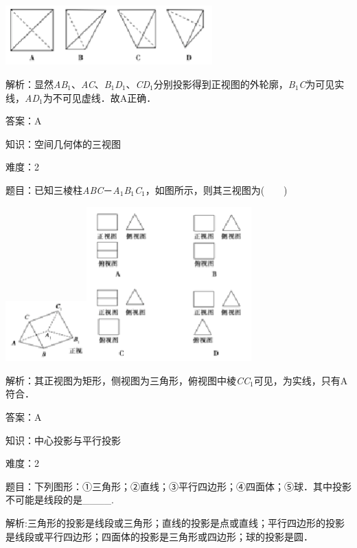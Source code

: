 \documentclass{article} %
\begin{document}
\includegraphics*[width=3.14in, height=0.90in, keepaspectratio=false]{image39}

解析：显然\textit{AB}${}_{1}$、\textit{AC}、\textit{B}${}_{1}$\textit{D}${}_{1}$、\textit{CD}${}_{1}$分别投影得到正视图的外轮廓，\textit{B}${}_{1}$\textit{C}为可见实线，\textit{AD}${}_{1}$为不可见虚线．故A正确．

答案：A


知识：空间几何体的三视图

难度：2

题目：已知三棱柱\textit{ABC}－\textit{A}${}_{1}$\textit{B}${}_{1}$\textit{C}${}_{1}$，如图所示，则其三视图为(　　)

\includegraphics*[width=1.23in, height=0.91in, keepaspectratio=false]{image40}\includegraphics*[width=2.50in, height=2.34in, keepaspectratio=false]{image41}

解析：其正视图为矩形，侧视图为三角形，俯视图中棱\textit{CC}${}_{1}$可见，为实线，只有A符合．

答案：A

知识：中心投影与平行投影

难度：2

题目：下列图形：①三角形；②直线；③平行四边形；④四面体；⑤球．其中投影不可能是线段的是\_\_\_\_.

解析:三角形的投影是线段或三角形；直线的投影是点或直线；平行四边形的投影是线段或平行四边形；四面体的投影是三角形或四边形；球的投影是圆．
\end{document}
